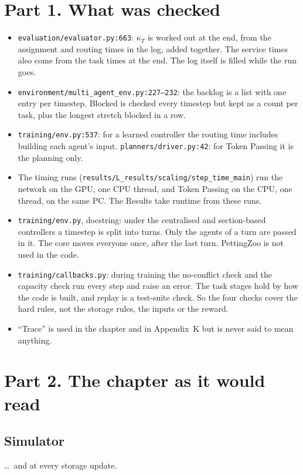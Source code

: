 \documentclass[11pt,a4paper]{article}
\newcommand{\lab}[1]{\textsf{\footnotesize\detokenize{#1}}}
\newcommand{\nref}[1]{\lab{#1}}
\begin{document}
\section*{Part 1. What was checked}
\begin{itemize}[nosep]
  \item \texttt{evaluation/evaluator.py:663}: $\kappa_T$ is worked out at the
    end, from the assignment and routing times in the log, added together.
    The service times also come from the task times at the end. The log
    itself is filled while the run goes.
  \item \texttt{environment/multi\_agent\_env.py:227--232}: the backlog is a
    list with one entry per timestep. Blocked is checked every timestep but
    kept as a count per task, plus the longest stretch blocked in a row.
  \item \texttt{training/env.py:537}: for a learned controller the routing
    time includes building each agent's input. \texttt{planners/driver.py:42}:
    for Token Passing it is the planning only.
  \item The timing runs (\texttt{results/L\_results/scaling/step\_time\_main})
    run the network on the GPU, one CPU thread, and Token Passing on the CPU,
    one thread, on the same PC. The Results take runtime from these runs.
  \item \texttt{training/env.py}, docstring: under the centralised and
    section-based controllers a timestep is split into turns. Only the agents
    of a turn are passed in it. The core moves everyone once, after the last
    turn. PettingZoo is not used in the code.
  \item \texttt{training/callbacks.py}: during training the no-conflict check
    and the capacity check run every step and raise an error. The task
    stages hold by how the code is built, and replay is a test-suite check.
    So the four checks cover the hard rules, not the storage rules, the
    inputs or the reward.
  \item ``Trace'' is used in the chapter and in Appendix~K but is never said
    to mean anything.
\end{itemize}

\section*{Part 2. The chapter as it would read}

\subsection*{Simulator}
\ldots\ and \nref{eq:storagegreedy} at every storage update.
\end{document}

